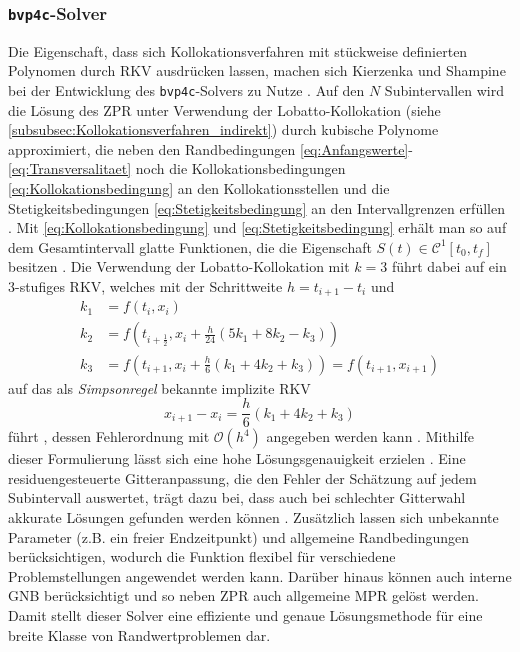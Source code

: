 \subsubsection{\texttt{bvp4c}-Solver}\label{subsubsec:bvp4c}
Die Eigenschaft, dass sich Kollokationsverfahren mit stückweise definierten Polynomen durch \gls{RKV} ausdrücken lassen, machen sich Kierzenka und Shampine bei der Entwicklung des \texttt{bvp4c}-Solvers zu Nutze \cite{Kierzenka.2001}. Auf den $N$ Subintervallen wird die Lösung des \gls{ZPR} unter Verwendung der Lobatto-Kollokation (siehe \ref{subsubsec:Kollokationsverfahren_indirekt}) durch kubische Polynome approximiert, die neben den Randbedingungen \eqref{eq:Anfangswerte}-\eqref{eq:Transversalitaet} noch die Kollokationsbedingungen \eqref{eq:Kollokationsbedingung} an den Kollokationsstellen und die Stetigkeitsbedingungen \eqref{eq:Stetigkeitsbedingung} an den Intervallgrenzen erfüllen \cite{Kierzenka.2001}. Mit \eqref{eq:Kollokationsbedingung} und \eqref{eq:Stetigkeitsbedingung} erhält man so auf dem Gesamtintervall glatte Funktionen, die die Eigenschaft $S(t) \in \mathcal{C}^1[t_0, t_f]$ besitzen \cite{Kierzenka.2001}. Die Verwendung der Lobatto-Kollokation mit $k=3$ führt dabei auf ein 3-stufiges \gls{RKV}, welches mit der Schrittweite $h=t_{i+1}-t_i$ und  
\begin{align}
	k_1 &= f(t_i,x_i) \\
	k_2 &= f(t_{i+\frac{1}{2}},x_i+\frac{h}{24}(5k_1+8k_2-k_3)) \\
	k_3 &= f(t_{i+1},x_i+\frac{h}{6}(k_1+4k_2+k_3)) = f(t_{i+1},x_{i+1})
\end{align}
auf das als \textit{Simpsonregel} bekannte implizite \gls{RKV}
\begin{equation}
	x_{i+1} - x_i = \frac{h}{6}(k_1+4k_2+k_3)
\end{equation} 
führt \cite{Cash.1980}, dessen Fehlerordnung mit $\mathcal{O}(h^4)$ angegeben werden kann \cite{Kierzenka.2001}. Mithilfe dieser Formulierung lässt sich eine hohe Lösungsgenauigkeit erzielen \cite{Kierzenka.2001}. Eine residuengesteuerte Gitteranpassung, die den Fehler der Schätzung auf jedem Subintervall auswertet, trägt dazu bei, dass auch bei schlechter Gitterwahl akkurate Lösungen gefunden werden können \cite{Kierzenka.2001}. Zusätzlich lassen sich unbekannte Parameter (z.B. ein freier Endzeitpunkt) und allgemeine Randbedingungen berücksichtigen, wodurch die Funktion flexibel für verschiedene Problemstellungen angewendet werden kann. Darüber hinaus können auch interne \gls{GNB} berücksichtigt und so neben \gls{ZPR} auch allgemeine \gls{MPR} gelöst werden. Damit stellt dieser Solver eine effiziente und genaue Lösungsmethode für eine breite Klasse von Randwertproblemen dar. 
